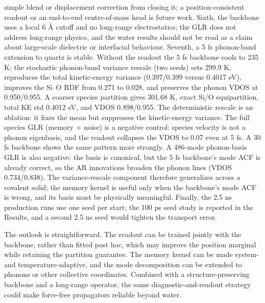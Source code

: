 simple blend or displacement correction from closing it; a position-consistent readout or an
end-to-end centre-of-mass head is future work. Sixth, the
backbone uses a local 6 \AA{} cutoff and no
long-range electrostatics; the GLR does not address long-range physics, and the water results
should not be read as a claim about large-scale dielectric or interfacial behaviour. Seventh, a
5 fs phonon-band extension to quartz is stable. Without the readout the 5 fs backbone cools to
235 K; the stochastic phonon-band variance rescale (two seeds) sets 299.9 K, reproduces the total
kinetic-energy variance (0.397/0.399 versus 0.4017 eV), improves the Si--O RDF from 0.271 to
0.028, and preserves the phonon VDOS at 0.950/0.955. A coarser species partition gives 301.68 K, exact
Si/O equipartition, total KE std 0.4012 eV, and VDOS 0.898/0.955. The deterministic rescale is an
ablation: it fixes the mean but suppresses the kinetic-energy variance. The full species GLR
(memory + noise) is a negative control: species velocity is not a phonon eigenbasis, and the
readout collapses the VDOS to 0.07 even at 5 fs. A 30 fs backbone shows the same pattern more
strongly. A 486-mode phonon-basis GLR is also negative: the basis is canonical, but the 5 fs
backbone's mode ACF is already correct, so the AR innovations broaden the phonon lines (VDOS
0.734/0.838). The variance-rescale component therefore generalizes across a covalent solid; the
memory kernel is useful only when the backbone's mode ACF is wrong, and its basis must be
physically meaningful. Finally, the 2.5 ns
production runs use one seed per start; the 100 ps seed study is reported in the Results, and a
second 2.5 ns seed would tighten the transport error.

The outlook is straightforward. The readout can be trained jointly with the backbone, rather than
fitted post hoc, which may improve the position marginal while retaining the partition guarantee.
The memory kernel can be made system- and temperature-adaptive, and the mode decomposition can be
extended to phonons or other collective coordinates. Combined with a structure-preserving backbone
and a long-range operator, the same diagnostic-and-readout strategy could make force-free
propagators reliable beyond water.
